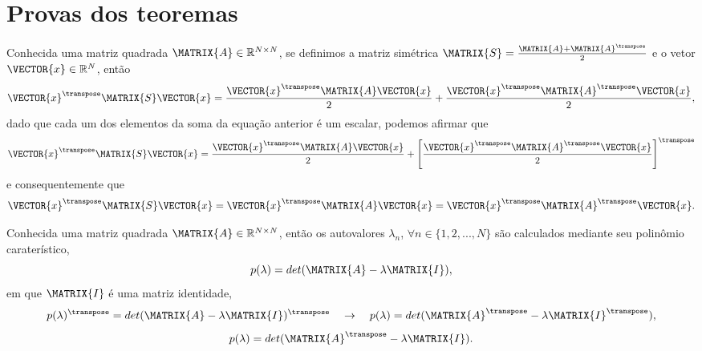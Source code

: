 \section{Provas dos teoremas}

\begin{myproofT}\label{proof:theo:simetricmatrix0}
Conhecida uma matriz quadrada $\MATRIX{A} \in \mathbb{R}^{N \times N}$,
se definimos a matriz simétrica $\MATRIX{S}=\frac{\MATRIX{A}+\MATRIX{A}^{\transpose}}{2}$ e
o vetor $\VECTOR{x} \in \mathbb{R}^{N}$, então
\begin{equation}
\VECTOR{x}^{\transpose}\MATRIX{S}\VECTOR{x} = 
\frac{\VECTOR{x}^{\transpose}\MATRIX{A}\VECTOR{x}}{2} +
\frac{\VECTOR{x}^{\transpose}\MATRIX{A}^{\transpose}\VECTOR{x}}{2},
\end{equation}
dado que cada um dos elementos da soma da equação anterior é um escalar, podemos afirmar que 
\begin{equation}
\VECTOR{x}^{\transpose}\MATRIX{S}\VECTOR{x} = 
\frac{\VECTOR{x}^{\transpose}\MATRIX{A}\VECTOR{x}}{2} +
\left[\frac{\VECTOR{x}^{\transpose}\MATRIX{A}^{\transpose}\VECTOR{x}}{2}\right]^{\transpose}
\end{equation}
e consequentemente que
\begin{equation}
\VECTOR{x}^{\transpose}\MATRIX{S}\VECTOR{x} = 
\VECTOR{x}^{\transpose}\MATRIX{A}\VECTOR{x} =
\VECTOR{x}^{\transpose}\MATRIX{A}^{\transpose}\VECTOR{x}.
\end{equation} 
\end{myproofT}

\begin{myproofT}\label{proof:theo:matrixgeneric3}
Conhecida uma matriz quadrada $\MATRIX{A} \in \mathbb{R}^{N \times N}$, 
então os  autovalores $\lambda_n$, $\forall n \in \{1, 2, ..., N\}$ são calculados mediante 
seu polinômio caraterístico,
\begin{equation}
p(\lambda)=det(\MATRIX{A}-\lambda \MATRIX{I}),
\end{equation}
em que $\MATRIX{I}$ é uma matriz identidade,
\begin{equation}
p(\lambda)^{\transpose}=det(\MATRIX{A}-\lambda \MATRIX{I})^{\transpose}
\quad \rightarrow \quad
p(\lambda)=det(\MATRIX{A}^{\transpose}-\lambda \MATRIX{I}^{\transpose}),
\end{equation}
\begin{equation}
p(\lambda)=det(\MATRIX{A}^{\transpose}-\lambda \MATRIX{I}).
\end{equation}
\end{myproofT}

